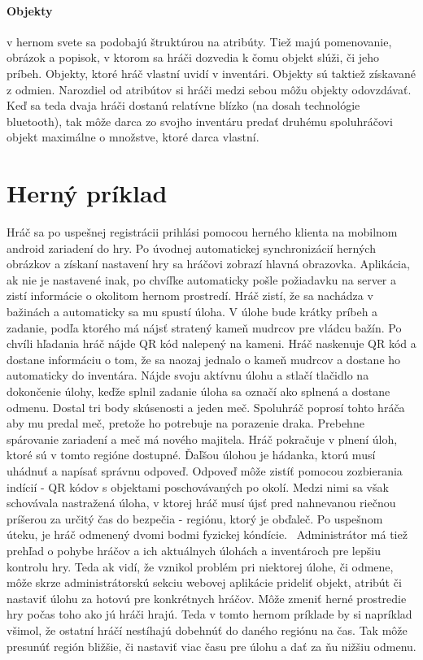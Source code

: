 \paragraph{Objekty} v hernom svete sa podobajú štruktúrou na atribúty. Tiež majú pomenovanie, obrázok a popisok, v ktorom sa hráči dozvedia k čomu objekt slúži, či jeho príbeh. Objekty, ktoré hráč vlastní uvidí v inventári. Objekty sú taktiež získavané z odmien. Narozdiel od atribútov si hráči medzi sebou môžu objekty odovzdávať. Keď sa teda dvaja hráči dostanú relatívne blízko (na dosah technológie bluetooth), tak môže darca zo svojho inventáru predať druhému spoluhráčovi objekt maximálne o množstve, ktoré darca vlastní.

\section{Herný príklad}
Hráč sa po uspešnej registrácii prihlási pomocou herného klienta na mobilnom android zariadení do hry. Po úvodnej automatickej synchronizácií herných obrázkov a získaní nastavení hry sa hráčovi zobrazí hlavná obrazovka. Aplikácia, ak nie je nastavené inak, po chvíľke automaticky pošle požiadavku na server a zistí informácie o okolitom hernom prostredí. Hráč zistí, že sa nachádza v bažinách a automaticky  sa mu spustí úloha. V úlohe bude krátky príbeh a zadanie, podľa ktorého má nájsť stratený kameň mudrcov pre vládcu bažín. Po chvíli hľadania hráč nájde QR kód nalepený na kameni. Hráč naskenuje QR kód a dostane informáciu o tom, že sa naozaj jednalo o kameň mudrcov a dostane ho automaticky do inventára. Nájde svoju aktívnu úlohu a stlačí tlačidlo na dokončenie úlohy, keďže splnil zadanie úloha sa označí ako splnená a dostane odmenu. Dostal tri body skúsenosti a jeden meč. Spoluhráč poprosí tohto hráča aby mu predal meč, pretože ho potrebuje na porazenie draka. Prebehne spárovanie zariadení a meč má nového majitela. Hráč pokračuje v plnení úloh, ktoré sú v tomto regióne dostupné. Ďaľšou úlohou je hádanka, ktorú musí uhádnuť a napísať správnu odpoveď. Odpoveď môže zistíť pomocou zozbierania indícií - QR kódov s objektami poschovávaných po okolí. Medzi nimi sa však schovávala nastražená úloha, v ktorej hráč musí újsť pred nahnevanou riečnou príšerou za určitý čas do bezpečia - regiónu, ktorý je obďaleč. Po uspešnom úteku, je hráč odmenený dvomi bodmi fyzickej kóndície. \
Administrátor má tiež prehľad o pohybe hráčov a ich aktuálnych úlohách a inventároch pre lepšiu kontrolu hry. Teda ak vidí, že vznikol problém pri niektorej úlohe, či odmene, môže skrze administrátorskú sekciu webovej aplikácie prideliť objekt, atribút či nastaviť úlohu za hotovú pre konkrétnych hráčov. Môže zmeniť herné prostredie hry počas toho ako jú hráči hrajú. Teda v tomto hernom príklade by si napríklad všimol, že ostatní hráčí nestíhajú dobehnúť do daného regiónu na čas. Tak môže presunúť región bližšie, či nastaviť viac času pre úlohu a dať za ňu nižšiu odmenu.

